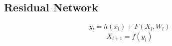\documentclass[]{article}
\begin{document}
\begin{CJK}{UTF8}{}
\section{Residual Network}
$$y_l=h(x_l)+F(X_l,W_l)$$
$$X_{l+1}=f(y_l)$$
\end{CJK}
\end{document}
